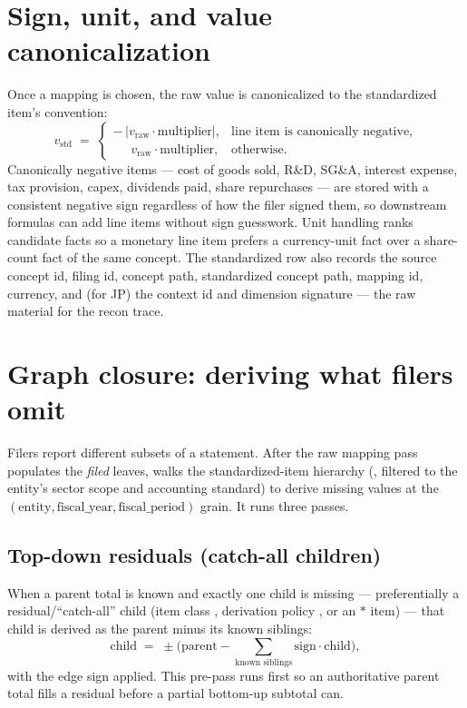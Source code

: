 \documentclass[11pt]{article}
\begin{document}
\section{Sign, unit, and value canonicalization}
\label{sec:canon}
Once a mapping is chosen, the raw value is canonicalized to the standardized item's
convention:
\begin{equation}
  v_{\text{std}} \;=\;
  \begin{cases}
    -\,\lvert v_{\text{raw}}\cdot \text{multiplier}\rvert, & \text{line item is canonically negative,}\\[2pt]
    \phantom{-}\,v_{\text{raw}}\cdot \text{multiplier}, & \text{otherwise.}
  \end{cases}
\end{equation}
Canonically negative items --- cost of goods sold, R\&D, SG\&A, interest expense,
tax provision, capex, dividends paid, share repurchases --- are stored with a
consistent negative sign regardless of how the filer signed them, so downstream
formulas can add line items without sign guesswork. Unit handling ranks candidate
facts so a monetary line item prefers a currency-unit fact over a share-count fact
of the same concept. The standardized row also records the source concept id,
filing id, concept path, standardized concept path, mapping id, currency, and (for
JP) the context id and dimension signature --- the raw material for the recon
trace.

\section{Graph closure: deriving what filers omit}
\label{sec:closure}
Filers report different subsets of a statement. After the raw mapping pass
populates the \emph{filed} leaves,  walks the
standardized-item hierarchy (, filtered to the entity's
sector scope and accounting standard) to derive missing values at the
$(\text{entity},\text{fiscal\_year},\text{fiscal\_period})$ grain. It runs three
passes.

\subsection{Top-down residuals (catch-all children)}
When a parent total is known and exactly one child is missing --- preferentially a
residual/``catch-all'' child (item class , derivation policy
, or an $\ast$ item) --- that child is derived as the
parent minus its known siblings:
\begin{equation}
  \text{child} \;=\; \pm\Big(\text{parent} - \!\!\sum_{\text{known siblings}}\!\! \text{sign}\cdot\text{child}\Big),
\end{equation}
with the edge sign applied. This pre-pass runs first so an authoritative parent
total fills a residual before a partial bottom-up subtotal can.
\end{document}
